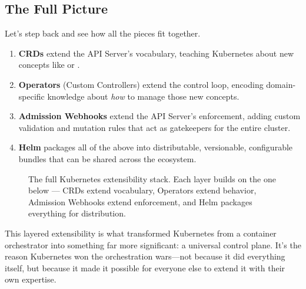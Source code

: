 \subsection{The Full Picture}


Let's step back and see how all the pieces fit together.

\begin{enumerate}
\item \textbf{CRDs} extend the API Server's vocabulary, teaching Kubernetes about new concepts like  or .
\item \textbf{Operators} (Custom Controllers) extend the control loop, encoding domain-specific knowledge about \textit{how} to manage those new concepts.
\item \textbf{Admission Webhooks} extend the API Server's enforcement, adding custom validation and mutation rules that act as gatekeepers for the entire cluster.
\item \textbf{Helm} packages all of the above into distributable, versionable, configurable bundles that can be shared across the ecosystem.
\end{enumerate}
\begin{figure}[htbp]
\centering

\caption{The full Kubernetes extensibility stack. Each layer builds on the one below --- CRDs extend vocabulary, Operators extend behavior, Admission Webhooks extend enforcement, and Helm packages everything for distribution.}
\label{fig:6_4}
\end{figure}



This layered extensibility is what transformed Kubernetes from a container orchestrator into something far more significant: a universal control plane. It's the reason Kubernetes won the orchestration wars---not because it did everything itself, but because it made it possible for everyone else to extend it with their own expertise.
